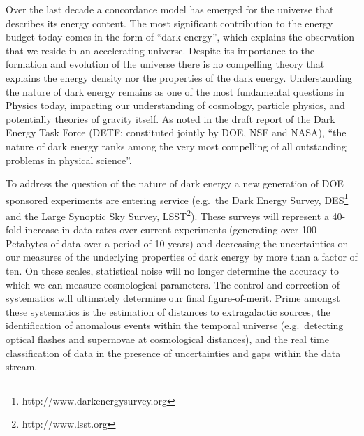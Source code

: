 \documentclass[useAMS,usenatbib,tightenlines,11pt,preprint]{aastex}
\begin{document}
Over the last decade a concordance model has emerged for the universe
that describes its energy content. The most significant contribution
to the energy budget today comes in the form of ``dark energy'', which
explains the observation that we reside in an accelerating
universe. Despite its importance to the formation and evolution of the
universe there is no compelling theory that explains the energy
density nor the properties of the dark energy. Understanding the
nature of dark energy remains as one of the most fundamental questions
in Physics today, impacting our understanding of cosmology, particle
physics, and potentially theories of gravity itself.  As noted in the draft
report of the Dark Energy Task Force (DETF; constituted jointly by
DOE, NSF and NASA), ``the nature of dark energy ranks among the very
most compelling of all outstanding problems in physical science''.


To address the question of the nature of dark energy a new generation
of DOE sponsored experiments are entering service (e.g.\ the Dark
Energy Survey, DES\footnote{http://www.darkenergysurvey.org} and the
Large Synoptic Sky Survey, LSST\footnote{http://www.lsst.org}).  These
surveys will represent a 40-fold increase in data rates over current
experiments (generating over 100 Petabytes of data over a period of 10
years) and decreasing the uncertainties on our measures of the
underlying properties of dark energy by more than a factor of ten. On
these scales, statistical noise will no longer determine the accuracy
to which we can measure cosmological parameters. The control and
correction of systematics will ultimately determine our final
figure-of-merit. Prime amongst these systematics is the estimation of
distances to extragalactic sources, the identification of anomalous
events within the temporal universe (e.g.\ detecting optical flashes
and supernovae at cosmological distances), and the real time
classification of data in the presence of uncertainties and gaps
within the data stream.


\end{document}
